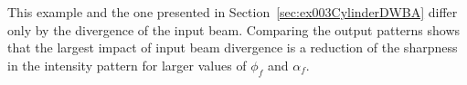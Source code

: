 This example and the one presented in Section~\ref{sec:ex003CylinderDWBA} differ only by the divergence of the input beam. Comparing the output patterns shows that the largest impact of input beam divergence is a reduction of the sharpness in the intensity pattern for larger values of $\phi_f$ and $\alpha_f$.\\




